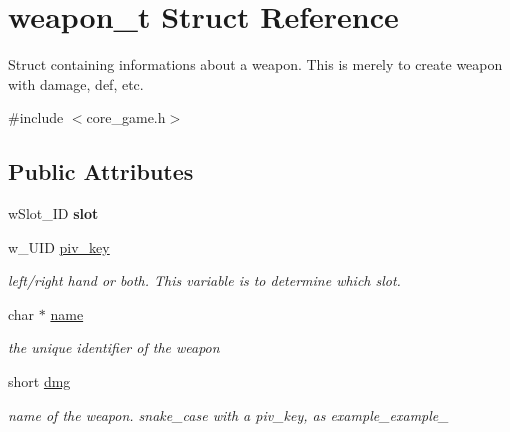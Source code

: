 \hypertarget{structweapon__t}{}\section{weapon\+\_\+t Struct Reference}
\label{structweapon__t}


Struct containing informations about a weapon. This is merely to create weapon with damage, def, etc.  




{\ttfamily \#include $<$core\+\_\+game.\+h$>$}

\subsection*{Public Attributes}
\begin{DoxyCompactItemize}
\item 
\mbox{\label{structweapon__t_a49876ea589af7e5edc00e43f0c011da0}} 
w\+Slot\+\_\+\+ID {\bfseries slot}
\item 
\mbox{\label{structweapon__t_a560ce476219efb594b5d5485c0e2a0ae}} 
w\+\_\+\+U\+ID \hyperlink{structweapon__t_a560ce476219efb594b5d5485c0e2a0ae}{piv\+\_\+key}
\begin{DoxyCompactList}\small\item\em left/right hand or both. This variable is to determine which slot. \end{DoxyCompactList}\item 
\mbox{\label{structweapon__t_ab942d4d7cf09b9e9aa28b9b661fb5347}} 
char $\ast$ \hyperlink{structweapon__t_ab942d4d7cf09b9e9aa28b9b661fb5347}{name}
\begin{DoxyCompactList}\small\item\em the unique identifier of the weapon \end{DoxyCompactList}\item 
\mbox{\label{structweapon__t_a8e7b2b07059bd84278afb6d992fff273}} 
short \hyperlink{structweapon__t_a8e7b2b07059bd84278afb6d992fff273}{dmg}
\begin{DoxyCompactList}\small\item\em name of the weapon. snake\+\_\+case with a piv\+\_\+key, as example\+\_\+example\+\_ \end{DoxyCompactList}\item 

\end{DoxyCompactItemize}
